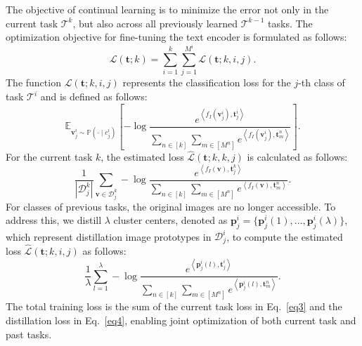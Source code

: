 \documentclass{article}
\theoremstyle{plain}
\theoremstyle{definition}
\theoremstyle{remark}
\begin{document}
The objective of continual learning is to minimize the error not only in the current task $\mathcal{T}^{k}$, but also across all previously learned $\mathcal{T}^{k-1}$ tasks. The optimization objective for fine-tuning the text encoder is formulated as follows:
\begin{equation}
\mathcal{L}(\boldsymbol{t}; k) = \sum_{i = 1}^{k} \sum_{j = 1}^{M^{i}} \mathcal{L}(\boldsymbol{t}; k, i, j).
\end{equation}
The function $\mathcal{L}(\boldsymbol{t}; k, i, j)$ represents the classification loss for the $j$-th class of task $\mathcal{T}^{i}$ and is defined as follows:
\begin{equation}
\mathbb{E}_{\boldsymbol{v}_{j}^{i} \sim \mathbb{P} (\cdot \mid c_{j}^{i}) } \left[- \log \frac{e ^{ \left \langle  f_{I}(\boldsymbol{v}_{j}^{i}), \boldsymbol{t}_{j}^{i} \right \rangle }}{\sum\limits_{n \in [k]} \sum\limits_{m \in [M^{n}]} e^ {\left \langle  f_{I}(\boldsymbol{v}_{j}^{i}), \boldsymbol{t}_{m}^{n} \right \rangle } }\right].
\end{equation}
%
For the current task $k$, the estimated loss $\widehat{\mathcal{L}} (\boldsymbol{t}; k, k, j)$ is calculated as follows:
\begin{equation}
\label{eq3}
\frac{1}{|\mathcal{D}^{k}_{j}|} \sum_{\boldsymbol{v} \in \mathcal{D}^{k}_{j}} - \log \frac{e ^{ \left \langle  f_{I}(\boldsymbol{v}), \boldsymbol{t}_{j}^{k} \right \rangle }}{\sum\limits_{n \in [k]} \sum\limits_{m \in [M^{n}]} e^ {\left \langle  f_{I}(\boldsymbol{v}),\boldsymbol{t}_{m}^{n} \right \rangle } }.
\end{equation}
For classes of previous tasks, the original images are no longer accessible.
To address this, we distill $\lambda$ cluster centers, denoted as $ \boldsymbol{p}_{j}^{i} = \{\boldsymbol{p}_{j}^{i}(1), \dots , \boldsymbol{p}_{j}^{i} (\lambda)\}$, which represent distillation image prototypes in $\mathcal{D}^{i}_{j}$, to compute the estimated loss $\widehat{\mathcal{L}} (\boldsymbol{t}; k, i, j)$ as follows:
\begin{equation}
\label{eq4}
\frac{1}{\lambda} \sum_{l=1}^{\lambda} - \log \frac{e ^{ \left \langle  \boldsymbol{p}_{j}^{i}(l), \boldsymbol{t}_{j}^{i} \right \rangle }}{\sum\limits_{n \in [k]} \sum\limits_{m \in [M^{n}]} e^ {\left \langle  \boldsymbol{p}_{j}^{i}(l), \boldsymbol{t}_{m}^{n} \right \rangle } }.
\end{equation}
The total training loss is the sum of the current task loss in Eq.~\eqref{eq3} and the distillation loss in Eq.~\eqref{eq4}, enabling joint optimization of both current task and past tasks.
\end{document}
